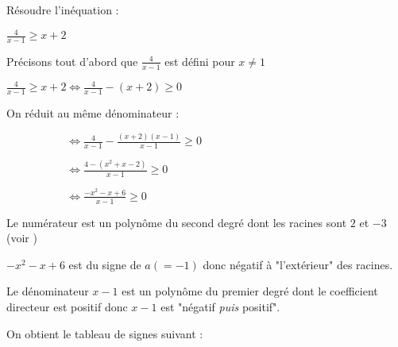 
%
Résoudre l'inéquation :
\par
$\frac{4}{x-1} \geqslant x+2$
\begin{corrige}
     Précisons tout d'abord que $\frac{4}{x-1}$ est défini pour $x\neq 1$
     \par
     $\frac{4}{x-1} \geqslant x+2 \Leftrightarrow \frac{4}{x-1}-\left(x + 2\right) \geqslant 0$
     \par
     On réduit au même dénominateur :
     \par
     $\phantom{\frac{4}{x-1} \geqslant x+2 } \Leftrightarrow \frac{4}{x-1}-\frac{\left(x + 2\right)\left(x-1\right)}{x-1} \geqslant 0$
     \par
     $\phantom{\frac{4}{x-1} \geqslant x+2 } \Leftrightarrow \frac{4-\left(x^{2}+x-2\right)}{x-1} \geqslant 0$
     \par
     $\phantom{\frac{4}{x-1} \geqslant x+2 } \Leftrightarrow \frac{-x^{2}-x+6}{x-1} \geqslant 0$
     \par
     Le numérateur est un polynôme du second degré dont les racines sont $2$ et $-3$ (voir )
     \par
     $-x^{2}-x+6$ est du signe de $a \left(=-1\right)$ donc négatif à "l'extérieur" des racines.
     \par
     Le dénominateur $x-1$ est un polynôme du premier degré dont le coefficient directeur est positif donc $x-1$ est "négatif \textit{puis} positif".
     \par
     On obtient le tableau de signes suivant :
\begin{center}
 \begin{extern}%
\end{extern}
\end{center}
\end{corrige}
